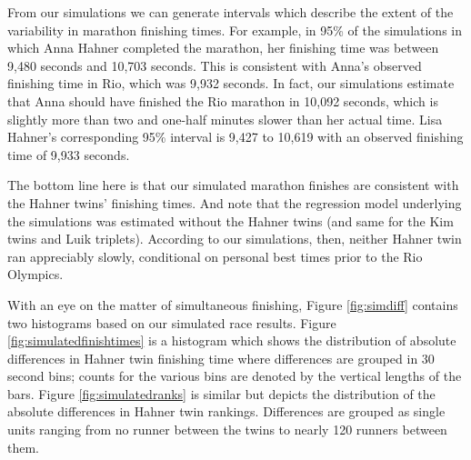 \documentclass[12pt,titlepage]{article}
\begin{document}
From our simulations we can generate intervals which describe the
extent of the variability in marathon finishing times. For example, in
95\% of the simulations in which Anna Hahner completed the marathon,
her finishing time was between 9,480 seconds and 10,703 seconds. This
is consistent with Anna's observed finishing time in Rio, which was
9,932 seconds. In fact, our simulations estimate that Anna should have
finished the Rio marathon in 10,092 seconds, which is slightly more
than two and one-half minutes slower than her actual time. Lisa
Hahner's corresponding 95\% interval is 9,427 to 10,619 with an
observed finishing time of 9,933 seconds.

The bottom line here is that our simulated marathon finishes are
consistent with the Hahner twins' finishing times. And note that the
regression model underlying the simulations was estimated without the
Hahner twins (and same for the Kim twins and Luik triplets). According
to our simulations, then, neither Hahner twin ran appreciably slowly,
conditional on personal best times prior to the Rio Olympics.



With an eye on the matter of simultaneous finishing, Figure
\ref{fig:simdiff} contains two histograms based on our simulated race
results. Figure \ref{fig:simulatedfinishtimes} is a histogram which
shows the distribution of absolute differences in Hahner twin
finishing time where differences are grouped in 30 second bins; counts
for the various bins are denoted by the vertical lengths of the bars.
Figure \ref{fig:simulatedranks} is similar but depicts the
distribution of the absolute differences in Hahner twin rankings.
Differences are grouped as single units ranging from no runner between
the twins to nearly 120 runners between them.
\end{document}
